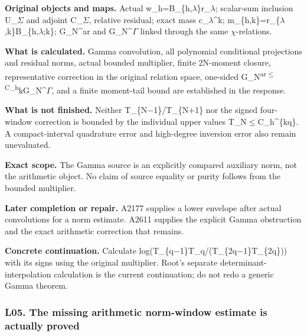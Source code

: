 \textbf{Original objects and maps.} Actual
w\_h=B\_\{h,\allowbreak{}\ensuremath{λ}\allowbreak{}\}r\_\allowbreak{}\ensuremath{λ}\allowbreak{};
scalar-sum inclusion U\_\allowbreak{}\ensuremath{Σ}\allowbreak{} and
adjoint C\_\allowbreak{}\ensuremath{Σ}\allowbreak{}, relative residual;
exact mass
c\_\allowbreak{}\ensuremath{λ}\allowbreak{}\textasciicircum{}k;
m\_\{h,k\}=r\_\{\allowbreak{}\ensuremath{λ}\allowbreak{},k\}B\_\{h,\allowbreak{}\ensuremath{λ}\allowbreak{};k\};
G\_N\^{}ar and
G\_N\textasciicircum{}\allowbreak{}\ensuremath{Γ}\allowbreak{} linked
through the same \allowbreak{}\ensuremath{χ}\allowbreak{}-relations.

\textbf{What is calculated.} Gamma convolution, all polynomial
conditional projections and residual norms, actual bounded multiplier,
finite 2N-moment closure, representative correction in the original
relation space, one-sided
G\_N\textsuperscript{ar\allowbreak{}\ensuremath{≤}\allowbreak{}C\_h}kG\_N\textasciicircum{}\allowbreak{}\ensuremath{Γ}\allowbreak{},
and a finite moment-tail bound are established in the response.

\textbf{What is not finished.} Neither
T\_\{N\allowbreak{}\ensuremath{−}\allowbreak{}1\}/T\_\{N+1\} nor the
signed four-window correction is bounded by the individual upper values
T\_N\allowbreak{}\ensuremath{≤}\allowbreak{}C\_h\textasciicircum{}\{kq\}.
A compact-interval quadrature error and high-degree inversion error also
remain unevaluated.

\textbf{Exact scope.} The Gamma source is an explicitly compared
auxiliary norm, not the arithmetic object. No claim of source equality
or purity follows from the bounded multiplier.

\textbf{Later completion or repair.} A2177 supplies a lower envelope
after actual convolutions for a norm estimate. A2611 supplies the
explicit Gamma obstruction and the exact arithmetic correction that
remains.

\textbf{Concrete continuation.} Calculate
log(T\_\{q\allowbreak{}\ensuremath{−}\allowbreak{}1\}T\_q/(T\_\{2q\allowbreak{}\ensuremath{−}\allowbreak{}1\}T\_\{2q\}))
with its signs using the original multiplier. Root's separate
determinant-interpolation calculation is the current continuation; do
not redo a generic Gamma theorem.

\subsubsection{L05. The missing arithmetic norm-window estimate is
actually
proved}\label{l05.-the-missing-arithmetic-norm-window-estimate-is-actually-proved}

